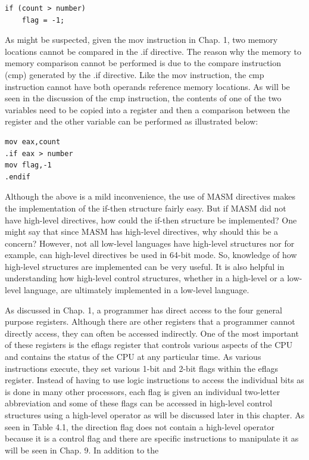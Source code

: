 \documentclass[10pt]{book}
\begin{document}
\begin{verbatim}
if (count > number)
    flag = -1;
\end{verbatim}

As might be suspected, given the mov instruction in Chap. 1, two memory locations cannot be compared in the .if directive. The reason why the memory to memory comparison cannot be performed is due to the compare instruction (cmp) generated by the .if directive. Like the mov instruction, the cmp instruction cannot have both operands reference memory locations. As will be seen in the discussion of the cmp instruction, the contents of one of the two variables need to be copied into a register and then a comparison between the register and the other variable can be performed as illustrated below:

\begin{verbatim}
mov eax,count
.if eax > number
mov flag,-1
.endif
\end{verbatim}

Although the above is a mild inconvenience, the use of MASM directives makes the implementation of the if-then structure fairly easy. But if MASM did not have high-level directives, how could the if-then structure be implemented? One might say that since MASM has high-level directives, why should this be a concern? However, not all low-level languages have high-level structures nor for example, can high-level directives be used in 64-bit mode. So, knowledge of how high-level structures are implemented can be very useful. It is also helpful in understanding how high-level control structures, whether in a high-level or a low-level language, are ultimately implemented in a low-level language.

As discussed in Chap. 1, a programmer has direct access to the four general purpose registers. Although there are other registers that a programmer cannot directly access, they can often be accessed indirectly. One of the most important of these registers is the eflags register that controls various aspects of the CPU and contains the status of the CPU at any particular time. As various instructions execute, they set various 1-bit and 2-bit flags within the eflags register. Instead of having to use logic instructions to access the individual bits as is done in many other processors, each flag is given an individual two-letter abbreviation and some of these flags can be accessed in high-level control structures using a high-level operator as will be discussed later in this chapter. As seen in Table 4.1, the direction flag does not contain a high-level operator because it is a control flag and there are specific instructions to manipulate it as will be seen in Chap. 9. In addition to the
\end{document}
